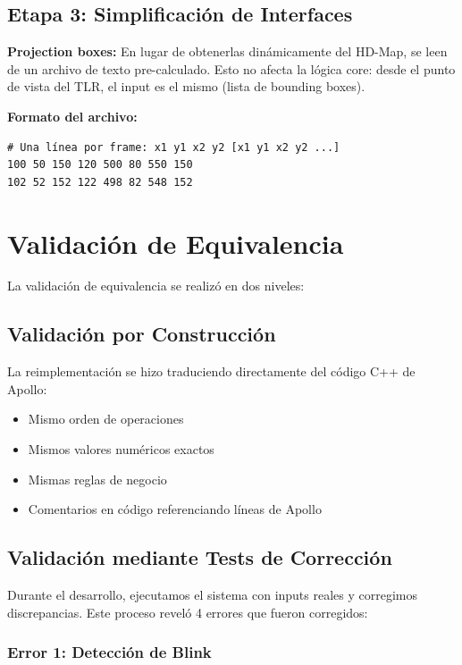 \subsection{Etapa 3: Simplificación de Interfaces}

\textbf{Projection boxes:} En lugar de obtenerlas dinámicamente del HD-Map, se leen de un archivo de texto pre-calculado. Esto no afecta la lógica core: desde el punto de vista del TLR, el input es el mismo (lista de bounding boxes).

\textbf{Formato del archivo:}
\begin{codesnippet}
\begin{verbatim}
# Una línea por frame: x1 y1 x2 y2 [x1 y1 x2 y2 ...]
100 50 150 120 500 80 550 150
102 52 152 122 498 82 548 152
\end{verbatim}
\end{codesnippet}

\section{Validación de Equivalencia}

La validación de equivalencia se realizó en dos niveles:

\subsection{Validación por Construcción}

La reimplementación se hizo traduciendo directamente del código C++ de Apollo:

\begin{itemize}
    \item Mismo orden de operaciones
    \item Mismos valores numéricos exactos
    \item Mismas reglas de negocio
    \item Comentarios en código referenciando líneas de Apollo
\end{itemize}

\subsection{Validación mediante Tests de Corrección}

Durante el desarrollo, ejecutamos el sistema con inputs reales y corregimos discrepancias. Este proceso reveló 4 errores que fueron corregidos:

\subsubsection{Error 1: Detección de Blink}


